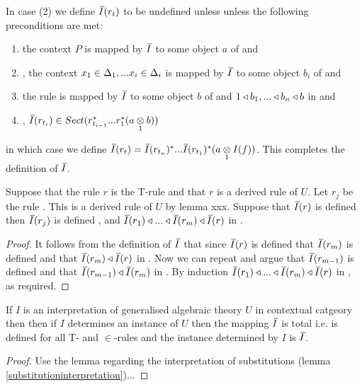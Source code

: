 \begin{definition} 
\begin{enumerate}[(i)]
In  case (2) 
we define $\Ibar(r_t)$ to be undefined unless  unless the following preconditions are met:
\begin{enumerate}
\item
the context  $P$ is mapped by $\Ibar$ to some object $a$ of \catcw and 
\item
\foreachi, the context $x_1 \in \Delta_1,... x_{i} \in \Delta_{i}$ is mapped by $\Ibar$ to some object $b_i$ of \catcw
and 
\item the rule \ZDelta is mapped by $\Ibar$ to some object $b$ of \catcw and
$1 \triangleleft b_1,...\triangleleft b_n \triangleleft b$ in \catcw 
and 
\item
\foreachi, $\Ibar(r_{t_i}) \in Sect(r_{t_{i-1}}^*...r_1^* (\crossx{a}{b}{1}))$
\end{enumerate}
in which case we
define $\Ibar(r_t)=\Ibar(r_{t_n})^*...\Ibar(r_{t_1})^*(\crossx{a}{I(f)}{1})$.
This completes the definition of $\Ibar$.
\end{enumerate}
\end{definition}


\begin{lemma}
Suppose that  the rule $r$ is the T-rule \ZOmega and that $r$ is a derived rule of $U$. 
Let $r_j$ be the rule
. This is a derived rule of $U$ by lemma xxx.
Suppose that $\Ibar(r)$ is defined then
$\Ibar(r_j)$ is defined \foreachj, and 
$\Ibar(r_1) \base  ... \base \Ibar(r_m) \base \Ibar(r)$ in \catc.
\end{lemma}
\begin{proof}
It follows from the definition of $\Ibar$ that since $\Ibar(r)$ is defined that $\Ibar(r_m)$ is defined and that
$\Ibar(r_m) \base \Ibar(r)$ in \catc. Now we can repeat and argue that $\Ibar(r_{m-1})$ is defined and that $\Ibar(r_{m-1}) \base \Ibar(r_m)$
in \catc. By induction $\Ibar(r_1) \base  ... \base \Ibar(r_m) \base \Ibar(r)$ in \catc, as required.
\end{proof}

\begin{lemma} 
If $I$ is an interpretation of generalised algebraic theory $U$ in contextual catgeory \catcw then then if $I$ determines an instance of $U$ then the
mapping $\Ibar$  is total i.e. is defined for all T- and $\in$-rules and the instance determined by $I$ is $\Ibar$.
\end{lemma}
\begin{proof}  
Use the lemma regarding the interpretation of substitutions (lemma \ref{substitutioninterpretation})...
\end{proof}

